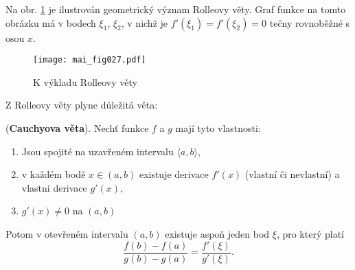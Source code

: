       \begin{note}
        Na obr. \ref{MAI:fig_027} je ilustrován geometrický význam Rolleovy věty. Graf funkce na 
        tomto obrázku má v bodech $\xi_1$, $\xi_2$, v nichž je $f'(\xi_1)=f'(\xi_2)=0$ tečny 
        rovnoběžné s osou $x$. 
        \begin{figure}[ht!] %
          \centering
          \texttt{[image: mai\_fig027.pdf]}
          \caption{K výkladu Rolleovy věty}
          \label{MAI:fig_027}
        \end{figure}
      \end{note}
      
      Z Rolleovy věty plyne důležitá věta:
      
      \begin{lemma}\label{MA1:lem_diff04}
        (\textbf{Cauchyova věta}). Nechť funkce $f$ a $g$ mají tyto vlastnosti:
        \begin{enumerate}
          \item  Jsou spojité na uzavřeném intervalu $\langle a,b\rangle$,
          \item  v každém bodě $x\in(a,b)$ existuje derivace $f'(x)$ (vlastní či nevlastní) a vlastní derivace $g'(x)$,
          \item  $g'(x)\neq0$ na $(a,b)$
        \end{enumerate}
        Potom v otevřeném intervalu $(a,b)$ existuje aspoň jeden bod $\xi$, pro který platí
        \begin{equation}\label{MA1:eq_diff03}
          \frac{f(b)-f(a)}{g(b)-g(a)} = \frac{f'(\xi)}{g'(\xi)}.
        \end{equation} 
      \end{lemma} 
      
